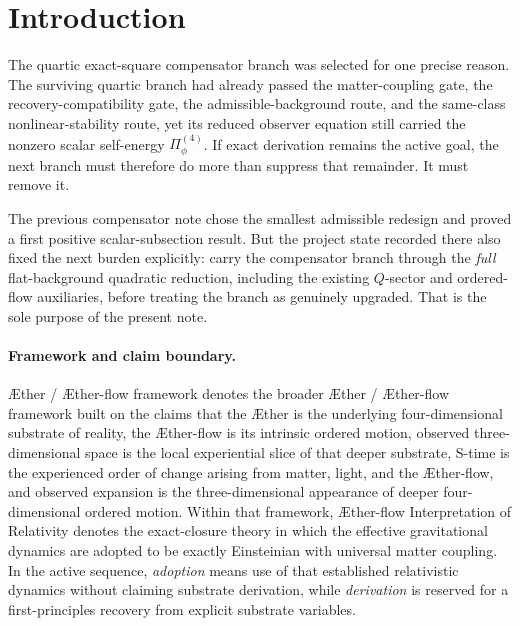 \documentclass[11pt]{article}
\newcommand{\Aether}{\AE{}ther}
\newcommand{\Aflow}{\AE{}ther-flow}
\newcommand{\TheoryName}{\Aflow{} Interpretation of Relativity}
\newcommand{\TheoryProgram}{\Aether{} / \Aflow{} framework}
\begin{document}
\begin{abstract}
The price of this success is structural and explicit. On the tuned branch the quartic observer scalar channel disappears completely, so the first replacement local/coercive architecture is no longer the old Einstein--quartic-scalar one. The narrowest replacement is instead a tuned-compensator strict auxiliary-elliptic branch: \(Q^I\) remain uniformly gapped slice-wise elliptic variables, \(Y\) is algebraic, \((\chi,W_i^T)\) are solved slice by slice under \(\kappa_\theta>0\), \(\kappa_\Omega>0\), and the scalar sector is carried only by the Stueckelberg-like momentum variable rather than by a quartic coercive Schr\"odinger channel.
\end{abstract}

\section{Introduction}

The quartic exact-square compensator branch was selected for one precise reason. The surviving quartic branch had already passed the matter-coupling gate, the recovery-compatibility gate, the admissible-background route, and the same-class nonlinear-stability route, yet its reduced observer equation still carried the nonzero scalar self-energy \(\Pi_\phi^{(4)}\). If exact derivation remains the active goal, the next branch must therefore do more than suppress that remainder. It must remove it.

The previous compensator note chose the smallest admissible redesign and proved a first positive scalar-subsection result. But the project state recorded there also fixed the next burden explicitly: carry the compensator branch through the \emph{full} flat-background quadratic reduction, including the existing \(Q\)-sector and ordered-flow auxiliaries, before treating the branch as genuinely upgraded. That is the sole purpose of the present note.

\paragraph{Framework and claim boundary.}
\TheoryProgram{} denotes the broader \Aether{} / \Aflow{} framework built on the claims that the \Aether{} is the underlying four-dimensional substrate of reality, the \Aflow{} is its intrinsic ordered motion, observed three-dimensional space is the local experiential slice of that deeper substrate, S-time is the experienced order of change arising from matter, light, and the \Aflow{}, and observed expansion is the three-dimensional appearance of deeper four-dimensional ordered motion. Within that framework, \TheoryName{} denotes the exact-closure theory in which the effective gravitational dynamics are adopted to be exactly Einsteinian with universal matter coupling. In the active sequence, \emph{adoption} means use of that established relativistic dynamics without claiming substrate derivation, while \emph{derivation} is reserved for a first-principles recovery from explicit substrate variables.
\end{document}
